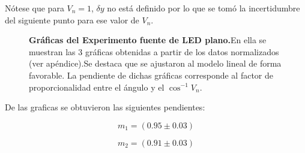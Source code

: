 \documentclass[DIV=calc, paper=a4, fontsize=11pt]{scrartcl}
\begin{document}
Nótese que para $V_n=1$, $\delta y$ no está definido por lo que se tomó la incertidumbre del siguiente punto para ese valor de $V_n$.
\begin{figure}[h!]
 \centering
 \caption{\textbf{Gráficas del Experimento fuente de LED plano.}En ella se muestran las 3 gráficas obtenidas a partir de los datos normalizados (ver apéndice).Se destaca que se ajustaron al modelo lineal de forma favorable. La pendiente de dichas gráficas corresponde al factor de proporcionalidad entre el ángulo y el $\cos^{-1}{V_n}$.}
 \label{f:Lambert}
\end{figure}

De las graficas se obtuvieron las siguientes pendientes:

\begin{equation*}
    m_1 = (0.95 \pm 0.03)
\end{equation*}



\begin{equation*}
    m_2 = (0.91 \pm 0.03)
\end{equation*}
\end{document}
